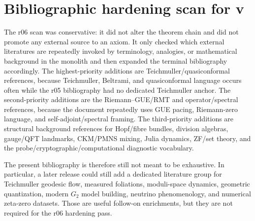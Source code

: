 \section*{Bibliographic hardening scan for v\docversion}

\noindent The r06 scan was conservative: it did not alter the theorem chain and did not promote any external source to an axiom. It only checked which external literatures are repeatedly invoked by terminology, analogies, or mathematical background in the monolith and then expanded the terminal bibliography accordingly. The highest-priority additions are Teichmuller/quasiconformal references, because Teichmuller, Beltrami, and quasiconformal language occurs often while the r05 bibliography had no dedicated Teichmuller anchor. The second-priority additions are the Riemann--GUE/RMT and operator/spectral references, because the document repeatedly uses GUE pacing, Riemann-zero language, and self-adjoint/spectral framing. The third-priority additions are structural background references for Hopf/fibre bundles, division algebras, gauge/QFT landmarks, CKM/PMNS mixing, Julia dynamics, ZF/set theory, and the probe/cryptographic/computational diagnostic vocabulary.

\noindent The present bibliography is therefore still not meant to be exhaustive. In particular, a later release could still add a dedicated literature group for Teichmuller geodesic flow, measured foliations, moduli-space dynamics, geometric quantization, modern $G_2$ model building, neutrino phenomenology, and numerical zeta-zero datasets. Those are useful follow-on enrichments, but they are not required for the r06 hardening pass.

\clearpage
